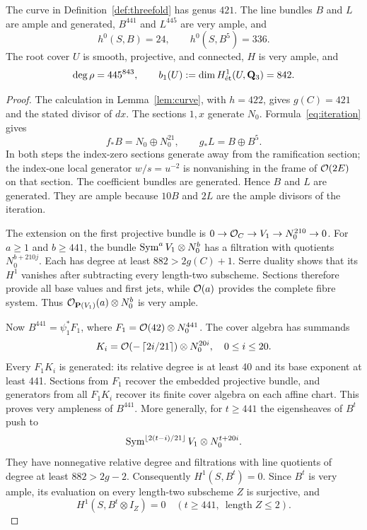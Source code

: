 \begin{proposition}\label{prop:threefold-positive}
The curve in Definition~\ref{def:threefold} has genus $421$. The line bundles $B$ and $L$ are ample and generated, $B^{441}$ and $L^{445}$ are very ample, and
\[
 h^0(S,B)=24,\qquad h^0(S,B^5)=336.
\]
The root cover $U$ is smooth, projective, and connected, $H$ is very ample, and
\[
 \deg\rho=445^{843},\qquad
 b_1(U):=\dim H^1_{\mathrm{\acute et}}(U,\mathbf Q_3)=842.
\]
\end{proposition}
\begin{proof}
The calculation in Lemma~\ref{lem:curve}, with $h=422$, gives $g(C)=421$ and the stated divisor of $dx$. The sections $1,x$ generate $N_0$. Formula~\eqref{eq:iteration} gives
\[
 f_*B=N_0\oplus N_0^{21},\qquad g_*L=B\oplus B^5.
\]
In both steps the index-zero sections generate away from the ramification section; the index-one local generator $w/s=u^{-2}$ is nonvanishing in the frame of $\mathcal O(2E)$ on that section. The coefficient bundles are generated. Hence $B$ and $L$ are generated. They are ample because $10B$ and $2L$ are the ample divisors of the iteration.

The extension on the first projective bundle is
$0\to\mathcal O_C\to V_1\to N_0^{210}\to0$. For $a\ge1$ and $b\ge441$, the bundle $\operatorname{Sym}^aV_1\otimes N_0^b$ has a filtration with quotients $N_0^{b+210j}$. Each has degree at least $882>2g(C)+1$. Serre duality shows that its $H^1$ vanishes after subtracting every length-two subscheme. Sections therefore provide all base values and first jets, while $\mathcal O(a)$ provides the complete fibre system. Thus $\mathcal O_{\mathbf P(V_1)}(a)\otimes N_0^b$ is very ample.

Now $B^{441}=\psi_1^*F_1$, where $F_1=\mathcal O(42)\otimes N_0^{441}$. The cover algebra has summands
\[
 K_i=\mathcal O\!\left(-\left\lceil2i/21\right\rceil\right)\otimes N_0^{20i},
 \quad 0\le i\le20.
\]
Every $F_1K_i$ is generated: its relative degree is at least 40 and its base exponent at least 441. Sections from $F_1$ recover the embedded projective bundle, and generators from all $F_1K_i$ recover its finite cover algebra on each affine chart. This proves very ampleness of $B^{441}$. More generally, for $t\ge441$ the eigensheaves of $B^t$ push to
\[
 \operatorname{Sym}^{\lfloor2(t-i)/21\rfloor}V_1\otimes N_0^{t+20i}.
\]
They have nonnegative relative degree and filtrations with line quotients of degree at least $882>2g-2$. Consequently $H^1(S,B^t)=0$. Since $B^t$ is very ample, its evaluation on every length-two subscheme $Z$ is surjective, and
\begin{equation}\label{eq:B-jets}
 H^1(S,B^t\otimes I_Z)=0\quad(t\ge441,\ \operatorname{length}Z\le2).
\end{equation}


\end{proof}

